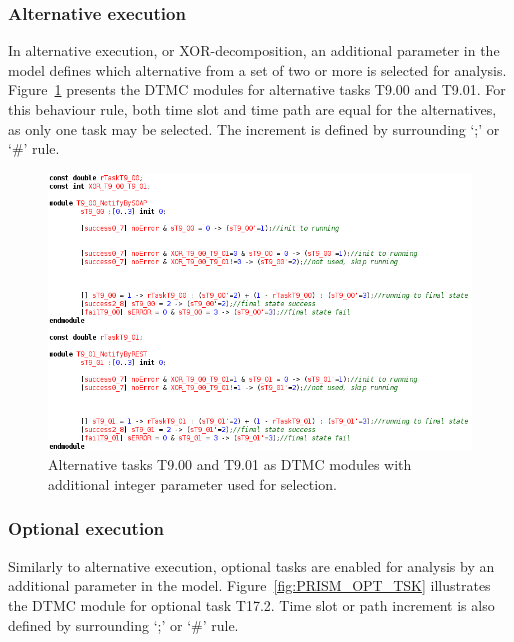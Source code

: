
\subsubsection{Alternative execution}

In alternative execution, or XOR-decomposition, an additional parameter in the model defines which alternative from a set of two or more is selected for analysis. Figure~\ref{fig:PRISM_ALT_TSKS} presents the DTMC modules for alternative tasks T9.00 and T9.01. For this behaviour rule, both time slot and time path are equal for the alternatives, as only one task may be selected. The increment is defined by surrounding `;' or `\#' rule. 

\begin{figure}[ht!]
\centering
\includegraphics[width=1\textwidth]{imgs/PRISM_ALT_TSKS.png}
\caption{Alternative tasks T9.00 and T9.01 as DTMC modules with additional integer parameter used for selection.}
\label{fig:PRISM_ALT_TSKS}
\end{figure}


\subsubsection{Optional execution}

Similarly to alternative execution, optional tasks are enabled for analysis by an additional parameter in the model. Figure~\ref{fig:PRISM_OPT_TSK} illustrates the DTMC module for optional task T17.2. Time slot or path increment is also defined by surrounding `;' or `\#' rule. 

